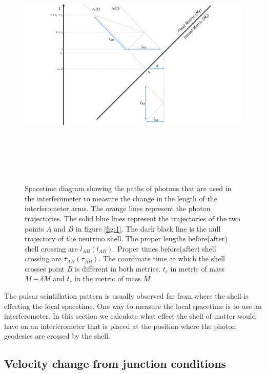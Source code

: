 \documentclass[aps,showpacs,onecolumn,floats,prd,superscriptaddress,nofootinbib]{revtex4-1}
\begin{document}
\begin{figure}[tb!]
\begin{center}
\includegraphics[width =\textwidth, height = 12cm]{calculation.pdf}
\caption{Spacetime diagram showing the paths of photons that are used in the interferometer to measure the change in the length of the interferometer arms. The orange lines represent the photon trajectories. The solid blue lines represent the trajectories of the two points $A$ and $B$ in figure \ref{fig:1}. The dark black line is the null trajectory of the neutrino shell. The proper lengths before(after) shell crossing are $\bar{l}_{AB}(l_{AB})$. Proper times before(after) shell crossing are $\bar{\tau}_{AB}(\tau_{AB})$. The coordinate time at which the shell crosses point $B$ is different in both metrics. $t_c$ in metric of mass $M-\delta M$ and $\bar{t}_c$ in the metric of mass $M$. }
\label{calculation}
\end{center}
\end{figure}
The pulsar scintillation pattern is usually observed far from where the shell is effecting the local spacetime. One way to measure the local spacetime is to use an interferometer. In this section we calculate what effect the shell of matter would have on an interferometer that is placed at the position where the photon geodesics are crossed by the shell.

\subsection{Velocity change from junction conditions}
\end{document}
